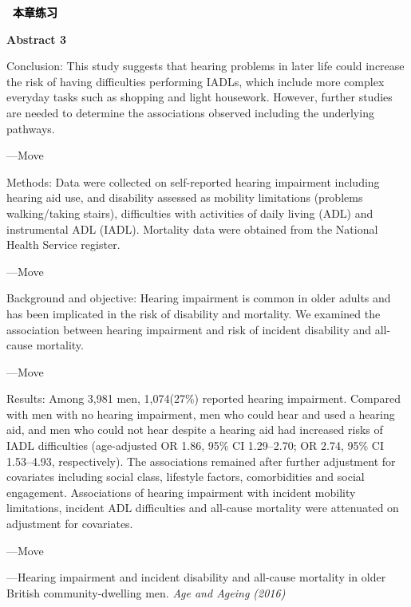 \documentclass[a4paper]{ctexbook}
\newenvironment{problemset}[1][本章练习]{
  \begin{center}
    \phantomsection\addcontentsline{toc}{section}{\texorpdfstring{本章练习}{Exercice}}
    \markright{#1}
    \textcolor{black}{\Large\bfseries\adftripleflourishleft~#1~\adftripleflourishright}
  \end{center}
  \begin{enumerate}}{
  \end{enumerate}}
\begin{document}
\begin{problemset}
  \textbf{Abstract 3}

  \hspace*{2em}Conclusion: This study suggests that hearing problems in later life could increase the risk of having difficulties performing IADLs, which include more complex everyday tasks such as shopping and light housework. However, further studies are needed to determine the associations observed including the underlying pathways.
  
  \hspace*{2em}---Move \uline{\hspace*{3em}} 
  
  \hspace*{2em}Methods: Data were collected on self-reported hearing impairment including hearing aid use, and disability assessed as mobility limitations (problems walking/taking stairs), difficulties with activities of daily living (ADL) and instrumental ADL (IADL). Mortality data were obtained from the National Health Service register.
  
  \hspace*{2em}---Move \uline{\hspace*{3em}}
  
  \hspace*{2em}Background and objective: Hearing impairment is common in older adults and has been implicated in the risk of disability and mortality. We examined the association between hearing impairment and risk of incident disability and all-cause mortality.

  \hspace*{2em}---Move \uline{\hspace*{3em}}
  
  \hspace*{2em}Results: Among 3,981 men, 1,074(27\%) reported hearing impairment. Compared with men with no hearing impairment, men who could hear and used a hearing aid, and men who could not hear despite a hearing aid had increased risks of IADL difficulties (age-adjusted OR 1.86, 95\% CI 1.29--2.70; OR 2.74, 95\% CI 1.53--4.93, respectively). The associations remained after further adjustment for covariates including social class, lifestyle factors, comorbidities and social engagement. Associations of hearing impairment with incident mobility limitations, incident ADL difficulties and all-cause mortality were attenuated on adjustment for covariates.
  
  \hspace*{2em}---Move \uline{\hspace*{3em}}
  
  \begin{flushright}
    ---Hearing impairment and incident disability and all-cause mortality in older British community-dwelling men. \emph{Age and Ageing (2016)}
  \end{flushright}
  
\end{problemset}
\end{document}
